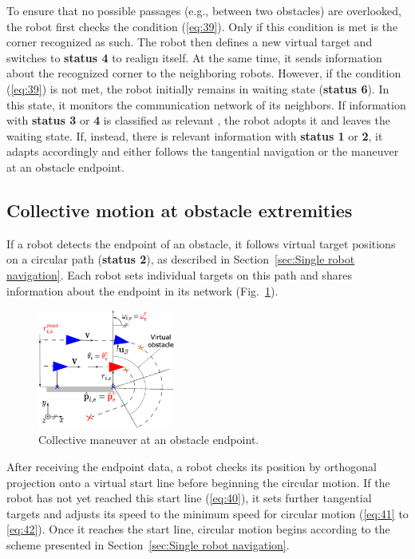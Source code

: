 \documentclass[conference]{IEEEtran}
\begin{document}
To ensure that no possible passages 
(e.g., between two obstacles) are overlooked, the robot first checks the 
condition (\eqref{eq:39}). Only if this condition is met is the corner recognized as such.
The robot then defines a new virtual target and switches to \textbf{status 4} 
to realign itself. At the same time, it sends information about the recognized corner 
to the neighboring robots.
However, if the condition (\eqref{eq:39}) is not met, the robot initially remains in 
waiting state (\textbf{status 6}). In this state, it monitors the communication network 
of its neighbors. If information with \textbf{status 3} or \textbf{4} is classified as relevant ,
 the robot adopts it and leaves the waiting state. If, 
instead, there is relevant information with \textbf{status 1} or \textbf{2}, it adapts accordingly 
and either follows the tangential navigation or the maneuver at an obstacle endpoint.

\subsection*{Collective motion at obstacle extremities}
If a robot detects the endpoint of an obstacle, it follows virtual target positions 
on a circular path (\textbf{status 2}), as described in 
Section~\ref{sec:Single robot navigation}. Each 
robot sets individual targets on this path and shares information about the 
endpoint in its network (Fig.~\ref{fig:Collective maneuver at an obstacle endpoint}).

\begin{figure}[h]
    \centering
    \includegraphics[width=0.4\textwidth]{Pictures/Collective maneuver at an obstacle endpoint.png}
    \caption{Collective maneuver at an obstacle endpoint.}
    \label{fig:Collective maneuver at an obstacle endpoint}
\end{figure}

After receiving the endpoint data, a robot checks its 
position by orthogonal projection onto a virtual start line 
before beginning the circular motion. If the robot has not yet reached this start line 
(\eqref{eq:40}), it sets further tangential targets and adjusts its 
speed to the minimum speed for circular motion 
(\eqref{eq:41} to \eqref{eq:42}). Once it reaches the start line, circular motion begins 
according to the scheme presented in 
Section~\ref{sec:Single robot navigation}.
\end{document}
